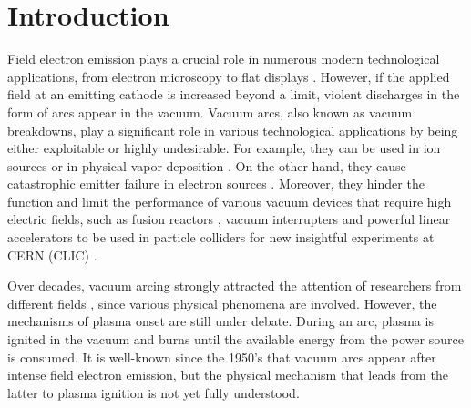 \documentclass[%
 aps,
 prb,%
 amsmath,amssymb,
reprint,%
superscriptaddress,
]{revtex4-1}
\begin{document}
\maketitle


\section{Introduction}

Field electron emission plays a crucial role in numerous modern technological applications, from electron microscopy to flat displays \cite{egorov2017field}. 
However, if the applied field at an emitting cathode is increased beyond a limit, violent discharges in the form of arcs appear in the vacuum.
Vacuum arcs, also known as vacuum breakdowns, play a significant role in various technological applications by being either exploitable or highly undesirable.
For example, they can be used in ion sources \cite{MEVVA1985} or in physical vapor deposition \cite{Anders}.
On the other hand, they cause catastrophic emitter failure in electron sources \cite{Anders_PRL88,Dyke1953Arc,Descoeudres2009_dc}.
Moreover, they hinder the function and limit the performance of various vacuum devices that require high electric fields, such as fusion reactors \cite{McCracken1980}, vacuum interrupters \cite{slade2007} and powerful linear accelerators to be used in particle colliders for new insightful experiments at CERN (CLIC) \citep{clic}. 

Over decades, vacuum arcing strongly attracted the attention of researchers from different fields \cite{Dyke1953Arc, Dyke1953I,DolanII,Anders_PRL88,Anders_PRL93,latham1995,Anders,Descoeudres2009}, since various physical phenomena are involved. 
However, the mechanisms of plasma onset are still under debate. 
During an arc, plasma is ignited in the vacuum and burns until the available energy from the power source is consumed.
It is well-known since the 1950's \citep{Dyke1953I,DolanII,Descoeudres2009,Anders} that vacuum arcs appear after intense field electron emission, but the physical mechanism that leads from the latter to plasma ignition is not yet fully understood. 
\end{document}
